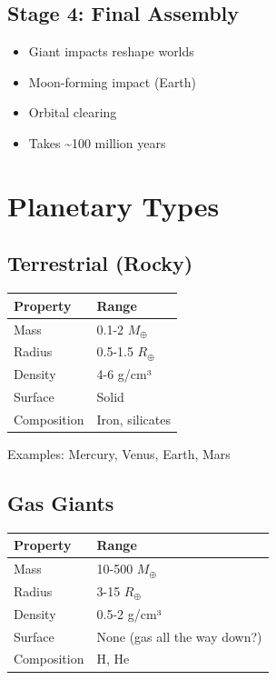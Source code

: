 \documentclass[
  11pt,
  letterpaper,
  twoside,
  openright]{book}
\providecommand{\tightlist}{%
  \setlength{\itemsep}{0pt}\setlength{\parskip}{0pt}}
\begin{document}
\subsection{Stage 4: Final Assembly}\label{stage-4-final-assembly}

\begin{itemize}
\tightlist
\item
  Giant impacts reshape worlds
\item
  Moon-forming impact (Earth)
\item
  Orbital clearing
\item
  Takes \textasciitilde100 million years
\end{itemize}

\section{Planetary Types}\label{planetary-types}

\subsection{Terrestrial (Rocky)}\label{terrestrial-rocky}

\begin{longtable}[]{@{}ll@{}}
\toprule\noalign{}
Property & Range \\
\midrule\noalign{}
\endhead
\bottomrule\noalign{}
\endlastfoot
Mass & 0.1-2 \(M_\oplus\) \\
Radius & 0.5-1.5 \(R_\oplus\) \\
Density & 4-6 g/cm³ \\
Surface & Solid \\
Composition & Iron, silicates \\
\end{longtable}

Examples: Mercury, Venus, Earth, Mars

\subsection{Gas Giants}\label{gas-giants}

\begin{longtable}[]{@{}ll@{}}
\toprule\noalign{}
Property & Range \\
\midrule\noalign{}
\endhead
\bottomrule\noalign{}
\endlastfoot
Mass & 10-500 \(M_\oplus\) \\
Radius & 3-15 \(R_\oplus\) \\
Density & 0.5-2 g/cm³ \\
Surface & None (gas all the way down?) \\
Composition & H, He \\
\end{longtable}
\end{document}
